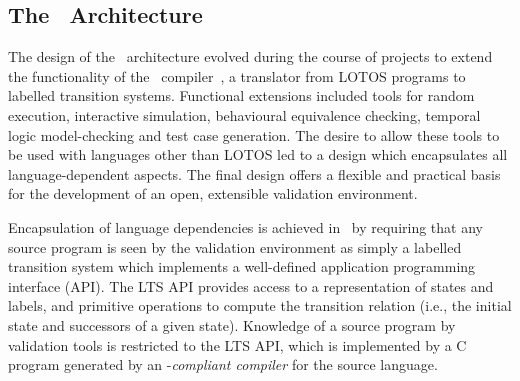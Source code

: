\subsection{The \opencaesar\ Architecture}
The design of the \opencaesar\ architecture evolved during the course
of projects to extend the functionality of the \caesar\
compiler~\cite{gar:92}, a translator from LOTOS programs to labelled
transition systems. Functional extensions included tools for random
execution, interactive simulation, behavioural equivalence checking,
temporal logic model-checking and test case generation. The desire to
allow these tools to be used with languages other than LOTOS led to a
design which encapsulates all language-dependent aspects.  The final
design offers a flexible and practical basis for the development of an
open, extensible validation environment.

Encapsulation of language dependencies is achieved in \opencaesar\ by
requiring that any source program is seen by the validation environment
as simply a labelled transition system which implements a well-defined
application programming interface (API). The LTS API provides access to
a representation of states and labels, and primitive operations to
compute the transition relation (i.e., the initial state and successors
of a given state). Knowledge of a source program by validation tools
is restricted to the LTS API, which is implemented by a C program
generated by an \opencaesar-\emph{compliant compiler} for the source
language. 
    
